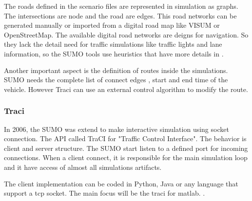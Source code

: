 The roads defined in the scenario files are represented in simulation as graphs. The intersections are node and the road are edges. This road networks can be generated manually or imported from a digital road map like VISUM\cite{VISUM} or OpenStreetMap\cite{OPENSTREETMAP}. The available digital road networks are deigns for navigation. So they lack the detail need for traffic simulations like traffic lights and lane information, so the SUMO tools use heuristics that have more details in\cite{krajzewicz2005preparation} . 

Another important aspect is the definition of routes inside the simulations. SUMO needs the complete list of connect edges , start and end time of the vehicle. However Traci can use an external control algorithm to modify the  route. 

\subsubsection{Traci}
\label{tracipart}
In 2006, the SUMO was extend to make interactive simulation using socket connection. The API called TraCI for "Traffic Control Interface".\cite{wegener2008traci} The behavior is client and server structure. The SUMO start listen to a defined port for incoming connections. When a client connect, it is responsible for the main simulation loop and it have access of almost all simulations artifacts.

The client implementation can be coded in Python, Java or any language that support a tcp socket. The main focus will be the traci for matlab. \cite{TraCI4Matlab}. 
